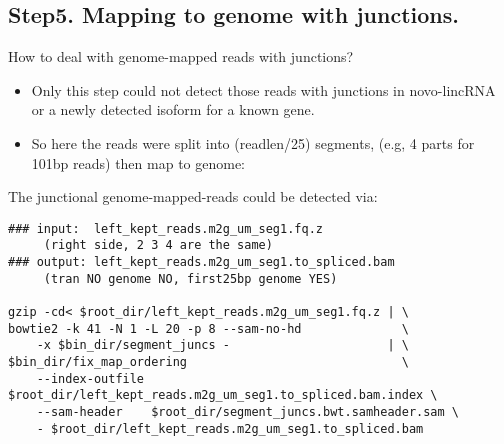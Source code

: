 \subsection{ Step5. Mapping to genome with junctions.} 
\begin{frame}[c,fragile]
	\begin{block}{ How to deal with genome-mapped reads with junctions? }
		\begin{itemize}
			\item Only this step could not detect those reads with junctions in novo-lincRNA or a newly detected isoform for a known gene.\\ \pause
			\item So here the reads were split into (readlen/25) \alert{segments}, (e.g, 4 parts for 101bp reads) then map to genome:
		\end{itemize}
	\end{block}
\end{frame}
\begin{frame}[c,fragile]
	\begin{block}{ The \alert{junctional genome-mapped-reads} could be detected via: }
		\begin{lstlisting}[basicstyle=\tiny]
### input:  left_kept_reads.m2g_um_seg1.fq.z          
     (right side, 2 3 4 are the same)
### output: left_kept_reads.m2g_um_seg1.to_spliced.bam
     (tran NO genome NO, first25bp genome YES)

gzip -cd< $root_dir/left_kept_reads.m2g_um_seg1.fq.z | \
bowtie2 -k 41 -N 1 -L 20 -p 8 --sam-no-hd              \
    -x $bin_dir/segment_juncs -                      | \
$bin_dir/fix_map_ordering                              \
    --index-outfile $root_dir/left_kept_reads.m2g_um_seg1.to_spliced.bam.index \
    --sam-header    $root_dir/segment_juncs.bwt.samheader.sam \
    - $root_dir/left_kept_reads.m2g_um_seg1.to_spliced.bam
		\end{lstlisting}
	\end{block}
\end{frame}
